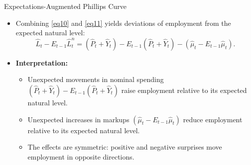 \documentclass[11pt,aspectratio=169]{beamer}
\begin{document}
\begin{frame}{Expectations-Augmented Phillips Curve}
\small
\begin{itemize}
    \item Combining \eqref{eq10} and \eqref{eq11} yields deviations of employment from the expected natural level:
    \[
    \hat{L}_{t}-E_{t-1}\hat{L}_{t}^{n}
    =(\hat{P}_{t}+\hat{Y}_{t})-E_{t-1}(\hat{P}_{t}+\hat{Y}_{t})
    -(\hat{\mu}_{t}-E_{t-1}\hat{\mu}_{t}).
    \]
    \item \textbf{Interpretation:}
    \begin{itemize}
        \item Unexpected movements in nominal spending \((\hat{P}_{t}+\hat{Y}_{t})-E_{t-1}(\hat{P}_{t}+\hat{Y}_{t})\) raise employment relative to its expected natural level.
        \item Unexpected increases in markups \((\hat{\mu}_{t}-E_{t-1}\hat{\mu}_{t})\) reduce employment relative to its expected natural level.
        \item The effects are symmetric: positive and negative surprises move employment in opposite directions.
    \end{itemize}
\end{itemize}
\end{frame}
\end{document}

